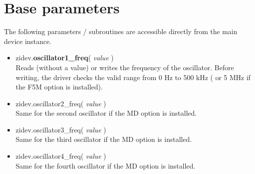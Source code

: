 \documentclass[11pt]{article} %
\begin{document}
\clearpage

\section{Base parameters}

The following parameters / subroutines are accessible directly from the main device instance.

\begin{itemize}
\item zidev.{\bf oscillator1\_freq}( {\it value} ) \\
	Reads (without a value) or writes the frequency of the oscillator. Before writing, the driver checks the valid range from 0 Hz to 500 kHz ( or 5 MHz if the F5M option is installed).
\item zidev.oscillator2\_freq( {\it value} ) \\
	Same for the second oscillator if the MD option is installed.
\item zidev.oscillator3\_freq( {\it value} ) \\
	Same for the third oscillator if the MD option is installed.
\item zidev.oscillator4\_freq( {\it value} ) \\
	Same for the fourth oscillator if the MD option is installed.


\end{itemize}
\end{document}
